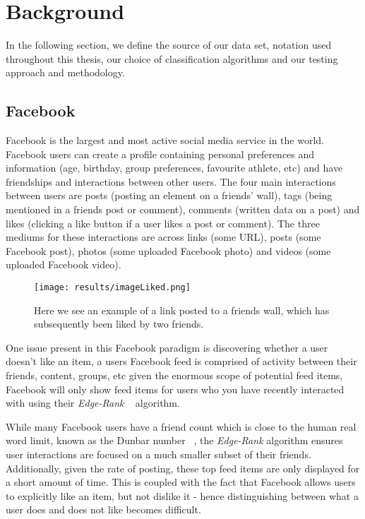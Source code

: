 
\chapter{Background}
\label{cha:back}

In the following section, we define the source of our data set, notation used throughout this thesis, our choice of classification algorithms and 
our testing approach and methodology.

\section{Facebook}
\label{sec:data}

Facebook is the largest and most active social media service in the world. Facebook users can create a profile containing personal 
preferences and information (age, birthday, group preferences, favourite athlete, etc) and have friendships and interactions 
between other users. The four main interactions between users are posts (posting an element on a friends' wall), tags
(being mentioned in a friends post or comment), comments (written data on a post) and likes (clicking a like button if a user 
likes a post or comment). The three mediums for these interactions are across links (some URL), posts (some Facebook post), 
photos (some uploaded Facebook photo) and videos (some uploaded Facebook video).

\begin{figure}[h]
	\begin{center}
		\texttt{[image: results/imageLiked.png]}
		\caption{Here we see an example of a link posted to a friends wall, which has subsequently been liked by two friends.}
	\end{center}
\end{figure}

\clearpage
One issue present in this Facebook paradigm is discovering whether a user doesn't like an item, a users Facebook feed is comprised of 
activity between their friends, content, groups, etc given the enormous scope of potential feed items, Facebook will only show feed 
items for users who you have recently interacted with using their \emph{Edge-Rank} ~\cite{edge} algorithm. 

While many Facebook users have a friend count which is close to the human real word limit, known as the Dunbar number 
~\cite{hill2003social}, the \emph{Edge-Rank} algorithm ensures user interactions are focused on a much smaller subset of their friends.
Additionally, given the rate of posting, these top feed items are only displayed for a short amount of time. This is coupled 
with the fact that Facebook allows users to explicitly like an item, but not dislike it - hence distinguishing between what 
a user does and does not like becomes difficult.

